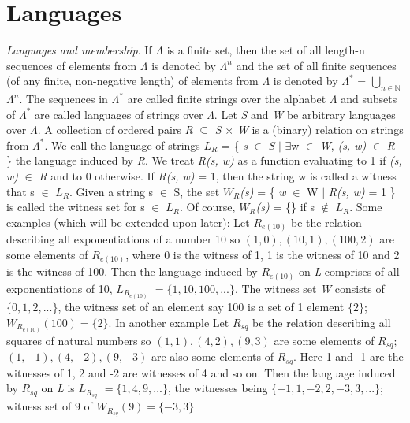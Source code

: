 \documentclass[a4paper]{article}
\begin{document}
\section{Languages}
\textit{Languages and membership}. If \(\Lambda\) is a finite set, then the set of all length-n sequences of elements from \(\Lambda\) is denoted by \(\Lambda^n\) and the set of all finite sequences (of any finite, non-negative length) of elements from \(\Lambda\) is denoted by \(\Lambda^{*}\) = \( \bigcup_{n\in\mathbb{N}} \)\(\Lambda^n\). The sequences in \(\Lambda^{*}\) are called finite strings over the alphabet \(\Lambda\) and subsets of \(\Lambda^{*}\) are called languages of strings over \(\Lambda\). Let \textit{S} and \textit{W} be arbitrary languages over \(\Lambda\). A collection of ordered pairs \textit{R} \(\subseteq\) \textit{S} \(\times\) \textit{W} is a (binary) relation on strings from \(\Lambda^{*}\). We call the language of strings \textit{$L_R$} {=} \{ \textit{s} $\in$ \textit{S} \(\mid\) \(\exists\)w $\in$ \textit{W}, \textit{(s, w)} $\in$ \textit{R} \} the language induced by \textit{R}. We treat \textit{R(s, w)} as a function evaluating to 1 if \textit{(s, w)} $\in$ \textit{R} and to 0 otherwise. If \textit{R(s, w)} = 1, then the string w is called a witness that s $\in$ \textit{$L_R$}. Given a string s $\in$ S, the set \textit{$W_R$(s)} = \{ \textit{w} $\in$ W $\mid$ \textit{R(s, w)} = 1 \}  is called the witness set for s $\in$ \textit{$L_R$}. Of course, \textit{$W_R$(s)} = \{\} if s $\notin$ \textit{$L_R$}. 
\newline
Some examples (which will be extended upon later): 
\newline
\indent Let \textit{$R_{e(10)}$} be the relation describing all exponentiations of a number 10 so $(1, 0), (10, 1), (100, 2)$ are some elements of \textit{$R_{e(10)}$}, where 0 is the witness of 1, 1 is the witness of 10 and 2 is the witness of 100. Then the language induced by {$R_{e(10)}$} on \textit{L} comprises of all exponentiations of 10, \textit{$L_{R_{e(10)}}$} $ = \{1, 10, 100, ...\} $. The witness set \textit{W} consists of $\{0, 1, 2, ...\}$, the witness set of an element say 100 is a set of 1 element $\{2\}$; $ W_{R_{e(10)}}(100) = \{2\} $. 
\newline
\indent In another example Let \textit{$R_{sq}$} be the relation describing all squares of natural numbers so $(1, 1), (4, 2), (9, 3)$ are some elements of \textit{$R_{sq}$}; $(1, -1), (4, -2), (9, -3)$ are also some elements of \textit{$R_{sq}$}. Here 1 and -1 are the witnesses of 1, 2 and -2 are witnesses of 4 and so on. Then the language induced by \textit{$R_{sq}$} on \textit{L} is \textit{$L_{R_{sq}}$} $ = \{1, 4, 9, ...\} $, the witnesses being $\{-1, 1, -2, 2, -3, 3, ...\}$; witness set of 9 of $ W_{R_{sq}}(9) = \{-3, 3\} $
\end{document}
